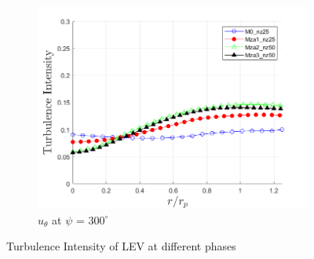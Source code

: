\begin{figure}[H]
\begin{subfigure}[b]{0.475\textwidth}
		\centering
		\includegraphics[width=1\textwidth]{figures/zonal_adapt_results/LEV/u_theta/TI_phase_300.png}
		\caption{$u_\theta$ at $\psi$ = $300^\circ$}
		\label{fig:zonal_TI_300}
	\end{subfigure}
	\caption{ Turbulence Intensity of LEV at different phases}
	\label{fig:zonal_TI_plots_LEV}
\end{figure}

